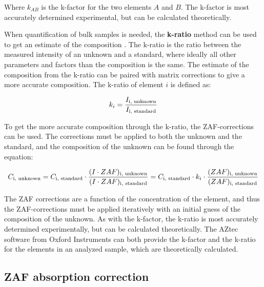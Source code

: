Where $k_{AB}$ is the k-factor for the two elements $A$ and $B$.
The k-factor is most accurately determined experimental, but can be calculated theoretically.


When quantification of bulk samples is needed, the \textbf{k-ratio} method can be used to get an estimate of the composition \cite[Ch. 19.1]{goldstein_scanning_2018}.
The k-ratio is the ratio between the measured intensity of an unknown and a standard, where ideally all other parameters and factors than the composition is the same.
The estimate of the composition from the k-ratio can be paired with matrix corrections to give a more accurate composition.
The k-ratio of element $i$ is defined as:

\begin{equation}
    \label{eq:theory:quantitative:k_ratio}
    k_i = \frac{I_\textnormal{i, unknown}}{I_\textnormal{i, standard}}
\end{equation}


To get the more accurate composition through the k-ratio, the ZAF-corrections can be used.
The corrections must be applied to both the unknown and the standard, and the composition of the unknown can be found through the equation:

\begin{equation}
    \label{eq:theory:quantitative:k_ratio_ZAF}
    C_\textnormal{i, unknown} = C_\textnormal{i, standard} \cdot  \frac{(I \cdot ZAF)_\textnormal{i, unknown}}{(I \cdot ZAF)_\textnormal{i, standard}} = C_\textnormal{i, standard} \cdot k_i \cdot \frac{(ZAF)_\textnormal{i, unknown}}{(ZAF)_\textnormal{i, standard}}
\end{equation}

The ZAF corrections are a function of the concentration of the element, and thus the ZAF-corrections must be applied iteratively with an initial guess of the composition of the unknown.
As with the k-factor, the k-ratio is most accurately determined experimentally, but can be calculated theoretically.
The AZtec software from Oxford Instruments \cite{aztec_manual} can both provide the k-factor and the k-ratio for the elements in an analyzed sample, which are theoretically calculated.










\subsection{ZAF absorption correction}
\label{theory:quantitative:zaf}

